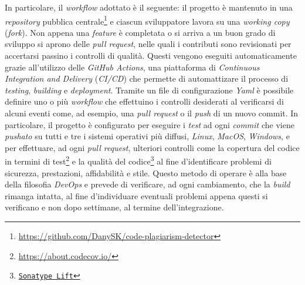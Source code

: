 In particolare, il \textit{workflow} adottato è il seguente: il progetto è mantenuto in una \textit{repository} pubblica centrale\footnote{\url{https://github.com/DanySK/code-plagiarism-detector}} e ciascun sviluppatore lavora su una \textit{working copy} (\textit{fork}).
%
Non appena una \textit{feature} è completata o si arriva a un buon grado di sviluppo si aprono delle \textit{pull request}, nelle quali i contributi sono revisionati per accertarsi passino i controlli di qualità.
%
Questi vengono eseguiti automaticamente grazie all'utilizzo delle \textit{GitHub Actions}, una piattaforma di \textit{Continuous Integration and Delivery} (\textit{CI/CD}) che permette di automattizare il processo di \textit{testing}, \textit{building} e \textit{deployment}.
%
Tramite un file di configurazione \textit{Yaml} è possibile definire uno o più \textit{workflow} che effettuino i controlli desiderati al verificarsi di alcuni eventi come, ad esempio, una \textit{pull request} o il \textit{push} di un nuovo commit.
%
In particolare, il progetto è configurato per eseguire i \textit{test} ad ogni \textit{commit} che viene \textit{pushato} su tutti e tre i sistemi operativi più diffusi, \textit{Linux}, \textit{MacOS}, \textit{Windows}, e per effettuare, ad ogni \textit{pull request}, ulteriori controlli come la copertura del codice in termini di test\footnote{\url{https://about.codecov.io/}} e la qualità del codice\footnote{\href{https://lift.sonatype.com/getting-started}{\texttt{Sonatype Lift}}} al fine d'identificare problemi di sicurezza, prestazioni, affidabilità e stile.
%
Questo metodo di operare è alla base della filosofia \textit{DevOps} e prevede di verificare, ad ogni cambiamento, che la \textit{build} rimanga intatta, al fine d'individuare eventuali problemi appena questi si verificano e non dopo settimane, al termine dell'integrazione.

